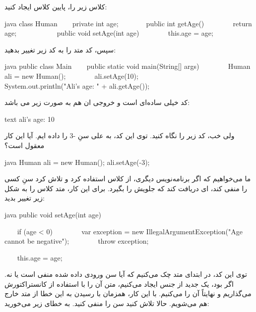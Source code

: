 کلاس زیر را، پایین کلاس  ایجاد کنید:

\begin{codebox}{java}
class Human {
    private int age;
    
    public int getAge() {
        return age;  
    }
    
    public void setAge(int age) {
        this.age = age;  
    }  
}
\end{codebox}

سپس، کد متد  را به کد زیر تغییر بدهید:

\begin{codebox}{java}
public class Main {
    public static void main(String[] args) {  
        Human ali = new Human();  
        ali.setAge(10);  
          
        System.out.println("Ali's age: " + ali.getAge());  
    }  
}
\end{codebox}

کد خیلی ساده‌ای است و خروجی‌ ان هم به صورت زیر می باشد:

\begin{codebox}{text}
ali's age: 10
\end{codebox}

ولی خب، کد زیر را نگاه کنید. توی این کد، به علی سنِ -3 را داده ایم. آیا
این کار معقول است؟

\begin{codebox}{java}
Human ali = new Human();  
ali.setAge(-3);
\end{codebox}

ما می‌خواهیم که اگر برنامه‌نویس دیگری، از کلاس  استفاده
کرد و تلاش کرد سنِ کسی را منفی کند،  ای دریافت کند
که جلویش را بگیرد. برای این کار، متد  کلاس
 را به شکل زیر تغییر بدید:

\begin{codebox}{java}
public void setAge(int age) {
    if (age < 0) {
        var exception = new IllegalArgumentException("Age cannot be negative");
        throw exception;  
    }

    this.age = age;  
}
\end{codebox}

توی این کد، در ابتدای متد  چک می‌کنیم که آیا سن ورودی
داده شده منفی است یا نه. اگر بود، یک  جدید از جنس
 ایجاد می‌کنیم، متن آن را با
استفاده از کانستراکتورش  می‌گذاریم
و نهایتاً آن را  می‌کنیم. با این کار، همزمان با رسیدن
به این خطا از متد خارج هم می‌شویم. حالا تلاش کنید سن  را
منفی کنید. به خطای زیر می‌خورید:

